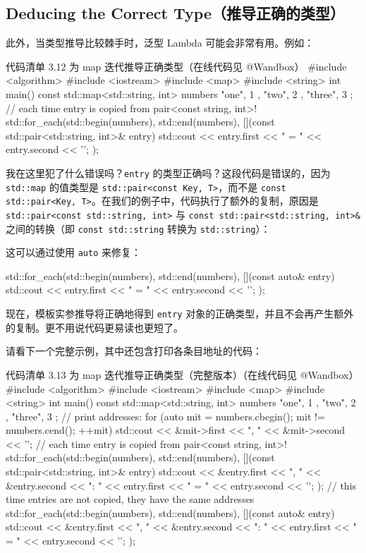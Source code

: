 \subsection{Deducing the Correct Type（推导正确的类型）}

此外，当类型推导比较棘手时，泛型 Lambda 可能会非常有用。例如：

\begin{codeboxt}{代码清单 3.12 为 map 迭代推导正确类型（在线代码见 @Wandbox）}
#include <algorithm>
#include <iostream>
#include <map>
#include <string>
int main() {
const std::map<std::string, int> numbers {
{ "one", 1 }, {"two", 2 }, { "three", 3 }
};
// each time entry is copied from pair<const string, int>!
std::for_each(std::begin(numbers), std::end(numbers),
[](const std::pair<std::string, int>& entry) {
std::cout << entry.first << " = " << entry.second << '\n';
}
);
}
\end{codeboxt}

我在这里犯了什么错误吗？\texttt{entry} 的类型正确吗？这段代码是错误的，因为 \texttt{std::map} 的值类型是 \texttt{std::pair<const Key, T>}，而不是 \texttt{const std::pair<Key, T>}。在我们的例子中，代码执行了额外的复制，原因是 \texttt{std::pair<const std::string, int>} 与 \texttt{const std::pair<std::string, int>\&} 之间的转换（即 \texttt{const std::string} 转换为 \texttt{std::string}）：

这可以通过使用 \texttt{auto} 来修复：

\begin{codebox}
std::for_each(std::begin(numbers), std::end(numbers),
[](const auto& entry) {
std::cout << entry.first << " = " << entry.second << '\n';
}
);
\end{codebox}

现在，模板实参推导将正确地得到 \texttt{entry} 对象的正确类型，并且不会再产生额外的复制。更不用说代码更易读也更短了。

请看下一个完整示例，其中还包含打印各条目地址的代码：

\begin{codeboxt}{代码清单 3.13 为 map 迭代推导正确类型（完整版本）（在线代码见 @Wandbox）}
#include <algorithm>
#include <iostream>
#include <map>
#include <string>
int main() {
const std::map<std::string, int> numbers {
{ "one", 1 }, {"two", 2 }, { "three", 3 }
};
// print addresses:
for (auto mit = numbers.cbegin(); mit != numbers.cend(); ++mit)
std::cout << &mit->first << ", " << &mit->second << '\n';
// each time entry is copied from pair<const string, int>!
std::for_each(std::begin(numbers), std::end(numbers),
[](const std::pair<std::string, int>& entry) {
std::cout << &entry.first << ", " << &entry.second << ": "
<< entry.first << " = " << entry.second << '\n';
}
);
// this time entries are not copied, they have the same addresses
std::for_each(std::begin(numbers), std::end(numbers),
[](const auto& entry) {
std::cout << &entry.first << ", " << &entry.second << ": "
<< entry.first << " = " << entry.second << '\n';
}
);
}
\end{codeboxt}

